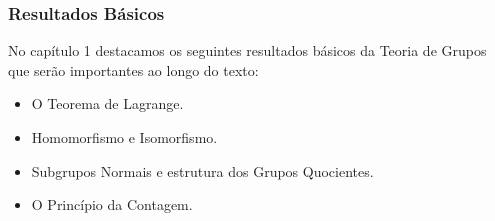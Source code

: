 \documentclass{beamer}
\begin{document}
\begin{frame}
\frametitle{Resultados Básicos}
No capítulo 1 destacamos os seguintes resultados básicos da Teoria de Grupos que serão importantes ao longo do texto:

\pause
\begin{itemize}%
\item O Teorema de Lagrange.

\pause
\item Homomorfismo e Isomorfismo.

\pause
\item Subgrupos Normais e estrutura dos Grupos Quocientes.

\pause
\item O Princípio da Contagem.
\end{itemize}
\end{frame}
\end{document}
